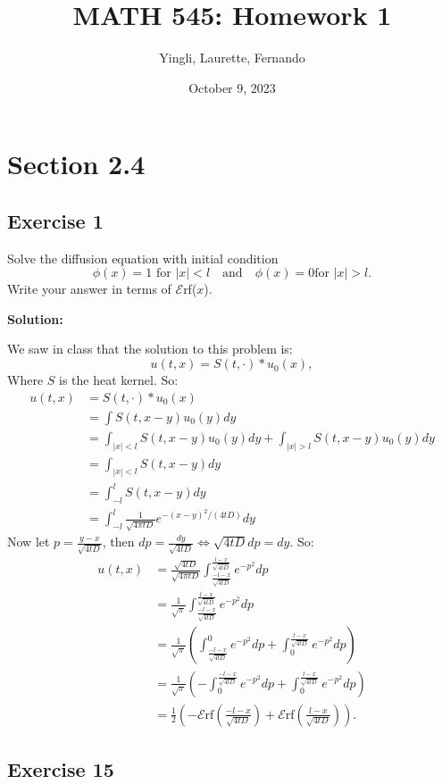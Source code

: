 \documentclass{article}
\title{MATH 545: Homework 1}
\author{Yingli, Laurette, Fernando}
\date{October 9, 2023}
\begin{document}
\maketitle
\section{Section 2.4}
\subsection{Exercise 1}
Solve the diffusion equation with initial condition
\[
\phi(x)=1\text{ for }|x|<l \quad \text{and} \quad \phi(x)=0 \text{
for } |x|>l.
\]
Write your answer in terms of $\mathscr{E}$rf($x$).

\textbf{Solution:}

We saw in class that the solution to this problem is:
\[
    u(t,x)=S(t,\cdot)\ast u_0(x),
\]
Where $S$ is the heat kernel. So:
\begin{align*}
    u(t,x)
    &=S(t,\cdot)\ast u_0(x)\\
    &=\int S(t,x-y)u_0(y)dy\\
    &=\int_{|x|<l} S(t,x-y)u_0(y)dy+ \int_{|x|> l} S(t,x-y)u_0(y)dy\\
    &=\int_{|x|<l} S(t,x-y)dy\\
    &=\int_{-l}^lS(t,x-y)dy\\
    &=\int_{-l}^l\frac{1}{\sqrt{4\pi t D}} e^{-(x-y)^2/(4tD)}dy
\end{align*}
Now let $p=\frac{y-x}{\sqrt{4tD}}$, then $dp=\frac{dy}{\sqrt{4tD}}\iff
\sqrt{4tD}dp=dy$. So:
\begin{align*}
    u(t,x)
    &=\frac{\sqrt{4tD}}{\sqrt{4\pi t
    D}}\int_{\frac{-l-x}{\sqrt{4tD}}}^{\frac{l-x}{\sqrt{4tD}}} e^{-p^2}dp\\
    &=\frac{1}{\sqrt{\pi}}\int_{\frac{-l-x}{\sqrt{4tD}}}^{\frac{l-x}{\sqrt{4tD}}} e^{-p^2}dp\\
    &=\frac{1}{\sqrt{\pi}}\left(\int_{\frac{-l-x}{\sqrt{4tD}}}^{0}
    e^{-p^2}dp+\int_{0}^{\frac{l-x}{\sqrt{4tD}}} e^{-p^2}dp\right)\\
    &=\frac{1}{\sqrt{\pi}}\left(-\int_{0}^{\frac{-l-x}{\sqrt{4tD}}}
    e^{-p^2}dp+\int_{0}^{\frac{l-x}{\sqrt{4tD}}} e^{-p^2}dp\right)\\
    &=\frac{1}{2}\left(-\mathscr{E}\text{rf}\left(\frac{-l-x}{\sqrt{4tD}}\right)+\mathscr{E}\text{rf}\left(\frac{l-x}{\sqrt{4tD}}\right)\right).
\end{align*}
\subsection{Exercise 15}
\end{document}
